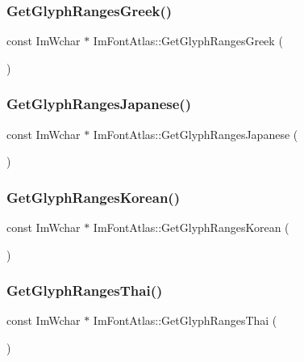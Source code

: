 \subsubsection{\texorpdfstring{Get\+Glyph\+Ranges\+Greek()}{GetGlyphRangesGreek()}}
{\footnotesize\ttfamily const Im\+Wchar $\ast$ Im\+Font\+Atlas\+::\+Get\+Glyph\+Ranges\+Greek (\begin{DoxyParamCaption}{ }\end{DoxyParamCaption})}

\mbox{\label{structImFontAtlas_a2654afbbf73835bf08278cdc6c181a96}} 
\subsubsection{\texorpdfstring{Get\+Glyph\+Ranges\+Japanese()}{GetGlyphRangesJapanese()}}
{\footnotesize\ttfamily const Im\+Wchar $\ast$ Im\+Font\+Atlas\+::\+Get\+Glyph\+Ranges\+Japanese (\begin{DoxyParamCaption}{ }\end{DoxyParamCaption})}

\mbox{\label{structImFontAtlas_ac70e07bd35913661c8fc50413b3bf969}} 
\subsubsection{\texorpdfstring{Get\+Glyph\+Ranges\+Korean()}{GetGlyphRangesKorean()}}
{\footnotesize\ttfamily const Im\+Wchar $\ast$ Im\+Font\+Atlas\+::\+Get\+Glyph\+Ranges\+Korean (\begin{DoxyParamCaption}{ }\end{DoxyParamCaption})}

\mbox{\label{structImFontAtlas_a4985c51d8a5270ff027f13fa44a14371}} 
\subsubsection{\texorpdfstring{Get\+Glyph\+Ranges\+Thai()}{GetGlyphRangesThai()}}
{\footnotesize\ttfamily const Im\+Wchar $\ast$ Im\+Font\+Atlas\+::\+Get\+Glyph\+Ranges\+Thai (\begin{DoxyParamCaption}{ }\end{DoxyParamCaption})}

